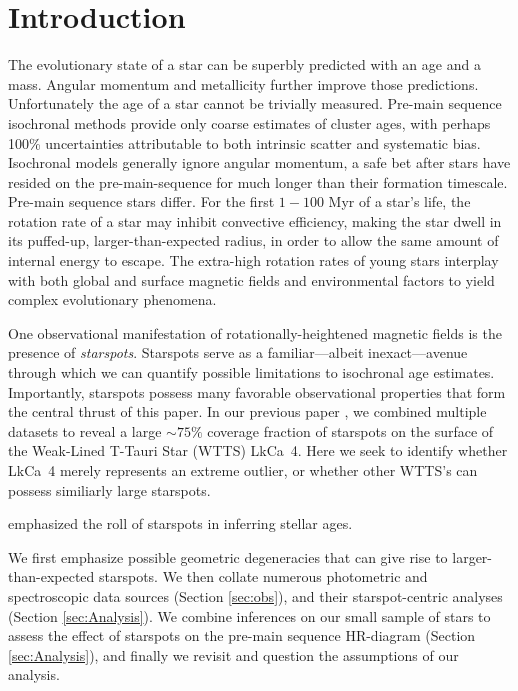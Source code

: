 \documentclass[revtex4]{emulateapj}%
\begin{document}
\maketitle

\section{Introduction}\label{sec:intro}

The evolutionary state of a star can be superbly predicted with an age and a mass.  Angular momentum and metallicity further improve those predictions.  Unfortunately the age of a star cannot be trivially measured.  Pre-main sequence isochronal methods provide only coarse estimates of cluster ages, with perhaps 100\% uncertainties attributable to both intrinsic scatter and systematic bias.  Isochronal models generally ignore angular momentum, a safe bet after stars have resided on the pre-main-sequence for much longer than their formation timescale.  Pre-main sequence stars differ.  For the first $1-100$ Myr of a star's life, the rotation rate of a star may inhibit convective efficiency, making the star dwell in its puffed-up, larger-than-expected radius, in order to allow the same amount of internal energy to escape.  The extra-high rotation rates of young stars interplay with both global and surface magnetic fields and environmental factors to yield complex evolutionary phenomena.

One observational manifestation of rotationally-heightened magnetic fields is the presence of \emph{starspots}.  Starspots serve as a familiar---albeit inexact---avenue through which we can quantify possible limitations to isochronal age estimates.  Importantly, starspots possess many favorable observational properties that form the central thrust of this paper.  In our previous paper \citep{2017ApJ...836..200G}, we combined multiple datasets to reveal a large $\sim75\%$ coverage fraction of starspots on the surface of the Weak-Lined T-Tauri Star (WTTS) LkCa~4.  Here we seek to identify whether LkCa~4 merely represents an extreme outlier, or whether other WTTS's can possess similiarly large starspots.

\citet{somers15} emphasized the roll of starspots in inferring stellar ages.

We first emphasize possible geometric degeneracies that can give rise to larger-than-expected starspots.  We then collate numerous photometric and spectroscopic data sources (Section \ref{sec:obs}), and their starspot-centric analyses (Section \ref{sec:Analysis}).  We combine inferences on our small sample of stars to assess the effect of starspots on the pre-main sequence HR-diagram (Section \ref{sec:Analysis}), and finally we revisit and question the assumptions of our analysis.
\end{document}
